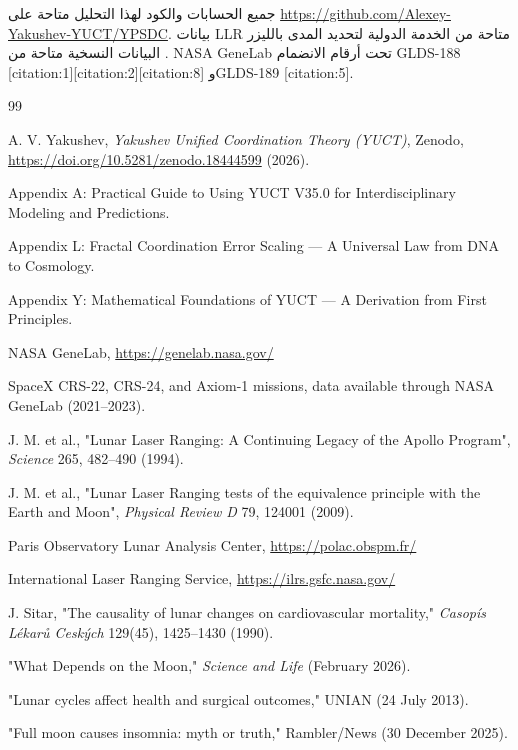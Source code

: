 \documentclass[11pt,a4paper]{article}
\theoremstyle{remark}
\begin{document}
	جميع الحسابات والكود لهذا التحليل متاحة على \url{https://github.com/Alexey-Yakushev-YUCT/YPSDC}. بيانات LLR متاحة من الخدمة الدولية لتحديد المدى بالليزر \cite{ILRS}. البيانات النسخية متاحة من NASA GeneLab \cite{NASA-GeneLab} تحت أرقام الانضمام GLDS-188 [citation:1][citation:2][citation:8] وGLDS-189 [citation:5].
	
	\begin{thebibliography}{99}
		
		A. V. Yakushev, \emph{Yakushev Unified Coordination Theory (YUCT)}, Zenodo, \url{https://doi.org/10.5281/zenodo.18444599} (2026).
		
		Appendix A: Practical Guide to Using YUCT V35.0 for Interdisciplinary Modeling and Predictions.
		
		Appendix L: Fractal Coordination Error Scaling — A Universal Law from DNA to Cosmology.
		
		Appendix Y: Mathematical Foundations of YUCT — A Derivation from First Principles.
		
		NASA GeneLab, \url{https://genelab.nasa.gov/}
		
		SpaceX CRS-22, CRS-24, and Axiom-1 missions, data available through NASA GeneLab (2021–2023).
		
		J. M. et al., "Lunar Laser Ranging: A Continuing Legacy of the Apollo Program", \emph{Science} 265, 482–490 (1994).
		
		J. M. et al., "Lunar Laser Ranging tests of the equivalence principle with the Earth and Moon", \emph{Physical Review D} 79, 124001 (2009).
		
		Paris Observatory Lunar Analysis Center, \url{https://polac.obspm.fr/}
		
		International Laser Ranging Service, \url{https://ilrs.gsfc.nasa.gov/}
		
		J. Sitar, "The causality of lunar changes on cardiovascular mortality," \emph{Casopís Lékarů Ceských} 129(45), 1425–1430 (1990).
		
		"What Depends on the Moon," \emph{Science and Life} (February 2026).
		
		"Lunar cycles affect health and surgical outcomes," UNIAN (24 July 2013).
		
		"Full moon causes insomnia: myth or truth," Rambler/News (30 December 2025).
		

\end{thebibliography}
\end{document}
